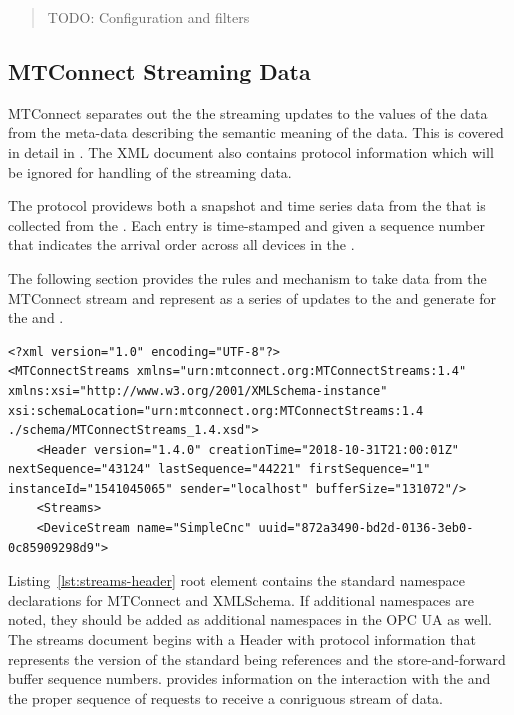 \begin{quote}
    \color{red} TODO: Configuration and filters
\end{quote}

\subsection{MTConnect Streaming Data}

MTConnect separates out the the streaming updates to the values of the data from the meta-data describing the semantic meaning of the data. This is covered in detail in \cite{MTCPart3}. The XML document also contains protocol information which will be ignored for handling of the streaming data. 

The  protocol providews both a snapshot and time series data from the  that is collected from the . Each entry is time-stamped and given a sequence number that indicates the arrival order across all devices in the .

The following section provides the rules and mechanism to take data from the MTConnect stream and represent as a series of updates to the  and generate  for the  and .

\begin{lstlisting}[firstnumber=1,escapechar=|,%
    caption={Streams Header},label={lst:streams-header}]
<?xml version="1.0" encoding="UTF-8"?>
<MTConnectStreams xmlns="urn:mtconnect.org:MTConnectStreams:1.4" xmlns:xsi="http://www.w3.org/2001/XMLSchema-instance" xsi:schemaLocation="urn:mtconnect.org:MTConnectStreams:1.4 ./schema/MTConnectStreams_1.4.xsd">
	<Header version="1.4.0" creationTime="2018-10-31T21:00:01Z" nextSequence="43124" lastSequence="44221" firstSequence="1" instanceId="1541045065" sender="localhost" bufferSize="131072"/>
	<Streams>
    <DeviceStream name="SimpleCnc" uuid="872a3490-bd2d-0136-3eb0-0c85909298d9">    
\end{lstlisting}

Listing~\ref{lst:streams-header} root element  contains the standard namespace declarations for MTConnect and XMLSchema. If additional namespaces are noted, they should be added as additional namespaces in the OPC UA  as well. The streams document begins with a Header with protocol information that represents the version of the standard being references and the store-and-forward buffer sequence numbers. \cite{MTCPart1} provides information on the interaction with the  and the proper sequence of requests to receive a conriguous stream of data.

